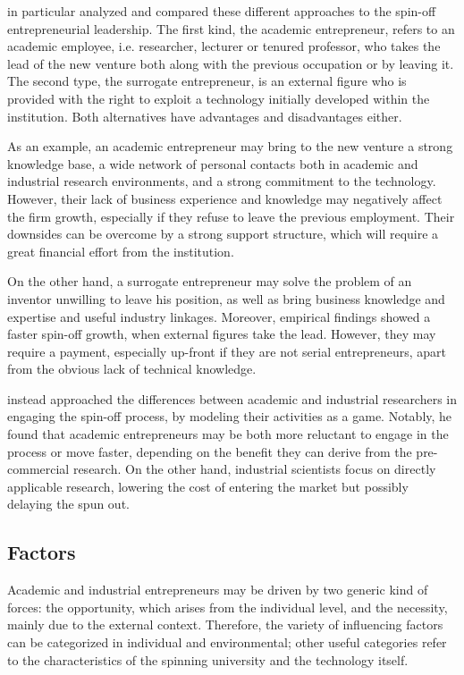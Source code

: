 \citet{Radosevich1995} in particular analyzed and compared these different approaches to the spin-off entrepreneurial leadership. The first kind, the academic entrepreneur, refers to an academic employee, i.e. researcher, lecturer or tenured professor, who takes the lead of the new venture both along with the previous occupation or by leaving it. The second type, the surrogate entrepreneur, is an external figure who is provided with the right to exploit a technology initially developed within the institution. Both alternatives have advantages and disadvantages either.

As an example, an academic entrepreneur may bring to the new venture a strong knowledge base, a wide network of personal contacts both in academic and industrial research environments, and a strong commitment to the technology. However, their lack of business experience and knowledge may negatively affect the firm growth, especially if they refuse to leave the previous employment. Their downsides can be overcome by a strong support structure, which will require a great financial effort from the institution. 

On the other hand, a surrogate entrepreneur may solve the problem of an inventor unwilling to leave his position, as well as bring business knowledge and expertise and useful industry linkages. Moreover, empirical findings showed a faster spin-off growth, when external figures take the lead. However, they may require a payment, especially up-front if they are not serial entrepreneurs, apart from the obvious lack of technical knowledge. 

\citet{Lacetera2006} instead approached the differences between academic and industrial researchers in engaging the spin-off process, by modeling their activities as a game. Notably, he found that academic entrepreneurs may be both more reluctant to engage in the process or move faster, depending on the benefit they can derive from the pre-commercial research. On the other hand, industrial scientists focus on directly applicable research, lowering the cost of entering the market but possibly delaying the spun out.   

\subsection{Factors}

Academic and industrial entrepreneurs may be driven by two generic kind of forces: the opportunity, which arises from the individual level, and the necessity, mainly due to the external context. Therefore, the variety of influencing factors can be categorized in individual and environmental; other useful categories refer to the characteristics of the spinning university and the technology itself.

